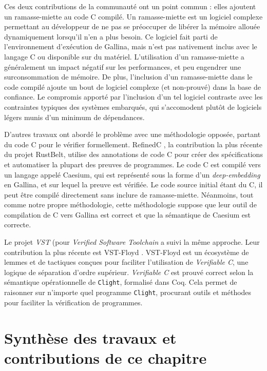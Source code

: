 Ces deux contributions de la communauté ont un point commun : elles ajoutent un ramasse-miette au code C compilé. Un ramasse-miette est un logiciel complexe permettant au développeur de ne pas se préoccuper de libérer la mémoire allouée dynamiquement lorsqu'il n'en a plus besoin. Ce logiciel fait parti de l'environnement d'exécution de Gallina, mais n'est pas nativement inclus avec le langage C ou disponible sur du matériel. L'utilisation d'un ramasse-miette a généralement un impact négatif sur les performances, et peu engendrer une surconsommation de mémoire. De plus, l'inclusion d'un ramasse-miette dans le code compilé ajoute un bout de logiciel complexe (et non-prouvé) dans la base de confiance. Le compromis apporté par l'inclusion d'un tel logiciel contraste avec les contraintes typiques des systèmes embarqués, qui s'accomodent plutôt de logiciels légers munis d'un minimum de dépendances.

D'autres travaux ont abordé le problème avec une méthodologie opposée, partant du code C pour le vérifier formellement. RefinedC \cite{refinedC}, la contribution la plus récente du projet RustBelt, utilise des annotations de code C pour créer des spécifications et automatiser la plupart des preuves de programmes. Le code C est compilé vers un langage appelé Caesium, qui est représenté sous la forme d'un \emph{deep-embedding} en Gallina, et sur lequel la preuve est vérifiée.
Le code source initial étant du C, il peut être compilé directement sans inclure de ramasse-miette. Néanmoins, tout comme notre propre méthodologie, cette méthodologie suppose que leur outil de compilation de C vers Gallina est correct et que la sémantique de Caesium est correcte.

Le projet \emph{VST} (pour \emph{Verified Software Toolchain} a suivi la même approche. Leur contribution la plus récente est VST-Floyd \cite{cao2018vst}. VST-Floyd est un écosystème de lemmes et de tactiques conçues pour faciliter l'utilisation de \emph{Verifiable C}, une logique de séparation d'ordre supérieur. \emph{Verifiable C} est prouvé correct selon la sémantique opérationnelle de \texttt{Clight}, formalisé dans Coq. Cela permet de raisonner sur n'importe quel programme \texttt{Clight}, procurant outils et méthodes pour faciliter la vérification de programmes.

\section{Synthèse des travaux et contributions de ce chapitre}

